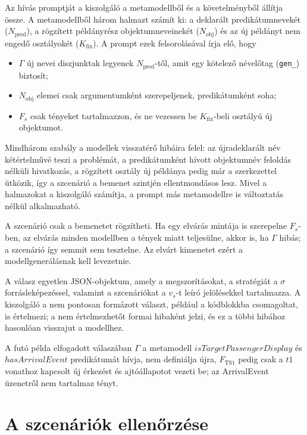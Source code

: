 Az  hívás promptját a kiszolgáló a metamodellből és a követelményből állítja össze. A metamodellből három halmazt számít ki: a deklarált predikátumnevekét ($N_{\mathrm{pred}}$), a rögzített példányrész objektumneveinekét ($N_{\mathrm{obj}}$) és az új példányt nem engedő osztályokét ($K_{\mathrm{fix}}$). A prompt ezek felsorolásával írja elő, hogy
\begin{itemize}
	\item $\Gamma$ új nevei diszjunktak legyenek $N_{\mathrm{pred}}$-től, amit egy kötelező névelőtag (\texttt{gen\_}) biztosít;
	\item $N_{\mathrm{obj}}$ elemei csak argumentumként szerepeljenek, predikátumként soha;
	\item $F_s$ csak tényeket tartalmazzon, és ne vezessen be $K_{\mathrm{fix}}$-beli osztályú új objektumot.
\end{itemize}
Mindhárom szabály a modellek visszatérő hibáira felel: az újradeklarált név kétértelművé teszi a problémát, a predikátumként hívott objektumnév feloldás nélküli hivatkozás, a rögzített osztály új példánya pedig már a szerkezettel ütközik, így a szcenárió a bemenet szintjén ellentmondásos lesz. Mivel a halmazokat a kiszolgáló számítja, a prompt más metamodellre is változtatás nélkül alkalmazható.

A szcenárió csak a bemenetet rögzítheti. Ha egy elvárás mintája is szerepelne $F_s$-ben, az elvárás minden modellben a tények miatt teljesülne, akkor is, ha $\Gamma$ hibás; a szcenárió így semmit sem tesztelne. Az elvárt kimenetet ezért a modellgenerálásnak kell levezetnie.

A válasz egyetlen JSON-objektum, amely a megszorításokat, a stratégiát a $\sigma$ forrásleképezéssel, valamint a szcenáriókat a $v_s$-t leíró jelölésekkel tartalmazza. A kiszolgáló a nem pontosan formázott választ, például a kódblokkba csomagoltat, is értelmezi; a nem értelmezhetőt formai hibaként jelzi, és ez a többi hibához hasonlóan visszajut a modellhez.

A futó példa elfogadott válaszában $\Gamma$ a metamodell $\mathit{isTargetPassengerDisplay}$ és $\mathit{hasArrivalEvent}$ predikátumát hívja, nem definiálja újra, $F_{\mathrm{TS1}}$ pedig csak a $\mathit{t1}$ vonathoz kapcsolt új érkezést és ajtóállapotot vezeti be; az ArrivalEvent üzenetről nem tartalmaz tényt.


\section{A szcenáriók ellenőrzése}
\label{sec:impl-validation}

